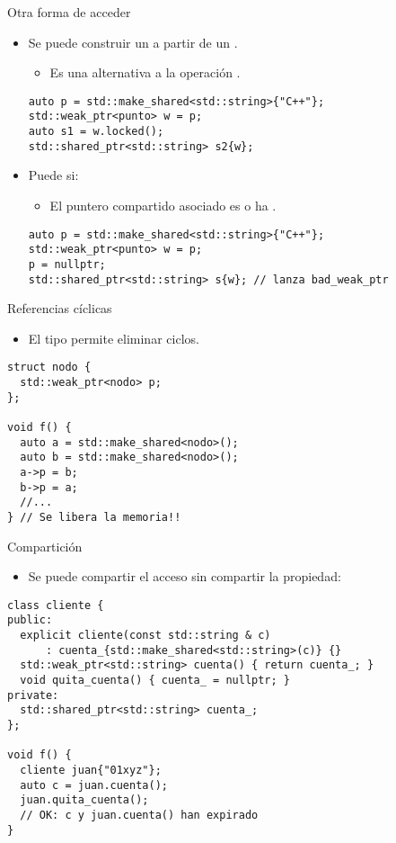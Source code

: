 \begin{frame}[t,fragile]{Otra forma de acceder}
\begin{itemize}
  \item Se puede construir un  a partir de un .
    \begin{itemize}
      \item Es una alternativa a la operación .
    \end{itemize}
\begin{lstlisting}
auto p = std::make_shared<std::string>{"C++"};
std::weak_ptr<punto> w = p;
auto s1 = w.locked();
std::shared_ptr<std::string> s2{w};
\end{lstlisting}

  \item Puede   si:
    \begin{itemize}
      \item El puntero compartido asociado es  o ha .
    \end{itemize}
\begin{lstlisting}
auto p = std::make_shared<std::string>{"C++"};
std::weak_ptr<punto> w = p;
p = nullptr;
std::shared_ptr<std::string> s{w}; // lanza bad_weak_ptr
\end{lstlisting}

\end{itemize}
\end{frame}

\begin{frame}[t,fragile]{Referencias cíclicas}
\begin{itemize}
  \item El tipo  permite eliminar ciclos.
\end{itemize}
\begin{lstlisting}
struct nodo {
  std::weak_ptr<nodo> p;
};

void f() {
  auto a = std::make_shared<nodo>();
  auto b = std::make_shared<nodo>();
  a->p = b;
  b->p = a;
  //...
} // Se libera la memoria!!
\end{lstlisting}
\end{frame}

\begin{frame}[t,fragile]{Compartición}
\begin{itemize}
  \item Se puede compartir el acceso sin compartir la propiedad:
\end{itemize}
\begin{lstlisting}
class cliente {
public:
  explicit cliente(const std::string & c) 
      : cuenta_{std::make_shared<std::string>(c)} {}
  std::weak_ptr<std::string> cuenta() { return cuenta_; }
  void quita_cuenta() { cuenta_ = nullptr; }
private:
  std::shared_ptr<std::string> cuenta_;
};

void f() {
  cliente juan{"01xyz"};
  auto c = juan.cuenta();
  juan.quita_cuenta();
  // OK: c y juan.cuenta() han expirado
}
\end{lstlisting}
\end{frame}

